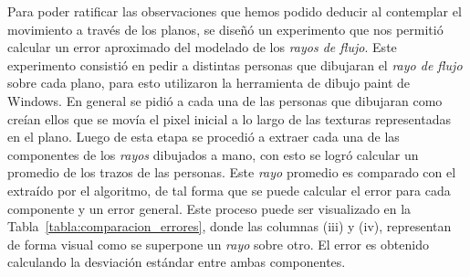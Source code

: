 Para poder ratificar las observaciones que hemos podido deducir al contemplar el movimiento a través de los planos, se diseñó un experimento que nos permitió calcular un error aproximado del modelado de los \textit{rayos de flujo}. Este experimento consistió en pedir a distintas personas que dibujaran el \textit{rayo de flujo} sobre cada plano, para esto utilizaron la herramienta de dibujo paint de Windows. En general se pidió a cada una de las personas que dibujaran como creían ellos que se movía el pixel inicial a lo largo de las texturas representadas en el plano. Luego de esta etapa se procedió a extraer cada una de las componentes de los \textit{rayos} dibujados a mano, con esto se logró calcular un promedio de los trazos de las personas. Este \textit{rayo} promedio es comparado con el extraído por el algoritmo, de tal forma que se puede calcular el error para cada componente y un error general. Este proceso puede ser visualizado en la Tabla~\ref{tabla:comparacion_errores}, donde las columnas (iii) y (iv), representan de forma visual como se superpone un \textit{rayo} sobre otro. El error es obtenido calculando la desviación estándar entre ambas componentes. 

